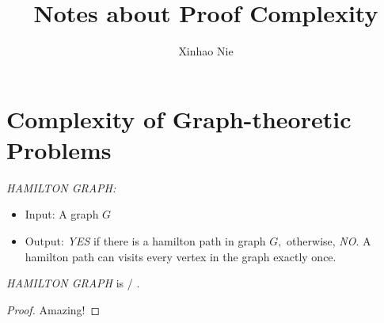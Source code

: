 \documentclass{article}
\begin{document}
\title{Notes about Proof Complexity}
\author{Xinhao Nie}
\maketitle

\section{Complexity of Graph-theoretic Problems}
\begin{define}
  \emph{HAMILTON GRAPH:}\normalfont
  \begin{itemize}
  \item Input: A graph $G$
  \item Output: \emph{YES} if there is a hamilton path in graph $G,$ otherwise, \emph{NO}. A hamilton path can visits every vertex in the graph exactly once.
  \end{itemize}
\end{define}

\begin{theorem}
  \emph{HAMILTON GRAPH} is \npc/ .
\end{theorem}

\begin{proof}
  Amazing!
\end{proof}
\end{document}
